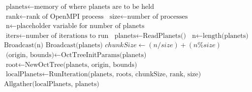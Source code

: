 \documentclass[acmtog,screen, nonacm=true]{acmart}
\begin{document}
\begin{algorithm}
\caption{Distributed processing of the Barnes-Hut algorithm}\label{alg:distributed}
\begin{algorithmic}[1]
\State $\text{planets} \gets \text{memory of where planets are to be held}$
\State $\text{rank} \gets \text{rank of OpenMPI process}$
\State $\text{size} \gets \text{number of processes}$
\State $\text{n} \gets \text{placeholder variable for number of planets}$
\State $\text{iters} \gets \text{number of iterations to run}$
    \State $\text{planets} \gets \text{ReadPlanets()}$
    \State $\text{n} \gets \text{length(planets)}$
\EndIf
\State $\text{Broadcast(n)}$
\State $\text{Broadcast(planets)}$
\State $chunkSize \gets (n/size)+(n\%size)$
    \State $\text{(origin, bounds)} \gets \text{OctTreeInitParams(planets)}$
    \State $\text{root} \gets \text{NewOctTree(planets, origin, bounds)}$
    \State $\text{localPlanets} \gets \text{RunIteration(planets, roots, chunkSize, rank, size)}$
    \State $\text{Allgather(localPlanets, planets)}$
\EndFor
\EndProcedure
\end{algorithmic}
\end{algorithm}
\end{document}
